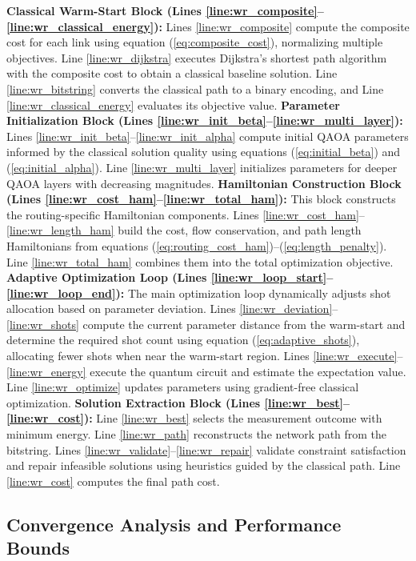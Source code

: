 \documentclass[lettersize,journal]{IEEEtran}
\begin{document}
\textbf{Classical Warm-Start Block (Lines \ref{line:wr_composite}--\ref{line:wr_classical_energy}):} Lines \ref{line:wr_composite} compute the composite cost for each link using equation (\ref{eq:composite_cost}), normalizing multiple objectives. Line \ref{line:wr_dijkstra} executes Dijkstra's shortest path algorithm with the composite cost to obtain a classical baseline solution. Line \ref{line:wr_bitstring} converts the classical path to a binary encoding, and Line \ref{line:wr_classical_energy} evaluates its objective value.
\textbf{Parameter Initialization Block (Lines \ref{line:wr_init_beta}--\ref{line:wr_multi_layer}):} Lines \ref{line:wr_init_beta}--\ref{line:wr_init_alpha} compute initial QAOA parameters informed by the classical solution quality using equations (\ref{eq:initial_beta}) and (\ref{eq:initial_alpha}). Line \ref{line:wr_multi_layer} initializes parameters for deeper QAOA layers with decreasing magnitudes.
\textbf{Hamiltonian Construction Block (Lines \ref{line:wr_cost_ham}--\ref{line:wr_total_ham}):} This block constructs the routing-specific Hamiltonian components. Lines \ref{line:wr_cost_ham}--\ref{line:wr_length_ham} build the cost, flow conservation, and path length Hamiltonians from equations (\ref{eq:routing_cost_ham})--(\ref{eq:length_penalty}). Line \ref{line:wr_total_ham} combines them into the total optimization objective.
\textbf{Adaptive Optimization Loop (Lines \ref{line:wr_loop_start}--\ref{line:wr_loop_end}):} The main optimization loop dynamically adjusts shot allocation based on parameter deviation. Lines \ref{line:wr_deviation}--\ref{line:wr_shots} compute the current parameter distance from the warm-start and determine the required shot count using equation (\ref{eq:adaptive_shots}), allocating fewer shots when near the warm-start region. Lines \ref{line:wr_execute}--\ref{line:wr_energy} execute the quantum circuit and estimate the expectation value. Line \ref{line:wr_optimize} updates parameters using gradient-free classical optimization.
\textbf{Solution Extraction Block (Lines \ref{line:wr_best}--\ref{line:wr_cost}):} Line \ref{line:wr_best} selects the measurement outcome with minimum energy. Line \ref{line:wr_path} reconstructs the network path from the bitstring. Lines \ref{line:wr_validate}--\ref{line:wr_repair} validate constraint satisfaction and repair infeasible solutions using heuristics guided by the classical path. Line \ref{line:wr_cost} computes the final path cost.

\subsection{Convergence Analysis and Performance Bounds}
\label{subsec:convergence}
\end{document}
